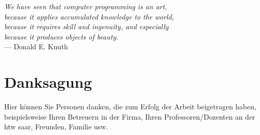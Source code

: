 
\begin{flushright}{\slshape
    We have seen that computer programming is an art, \\
    because it applies accumulated knowledge to the world, \\
    because it requires skill and ingenuity, and especially \\
    because it produces objects of beauty.} \\ \medskip
    --- Donald E. Knuth \cite{knuth:1974}
\end{flushright}

\bigskip

\begingroup
    \let\clearpage\relax
    \let\cleardoublepage\relax
    \let\cleardoublepage\relax
    \chapter*{Danksagung}
    Hier können Sie Personen danken, die zum Erfolg der Arbeit beigetragen haben, beispielsweise Ihren Betreuern in der Firma, Ihren Professoren/Dozenten an der htw saar, Freunden, Familie usw.
\endgroup
